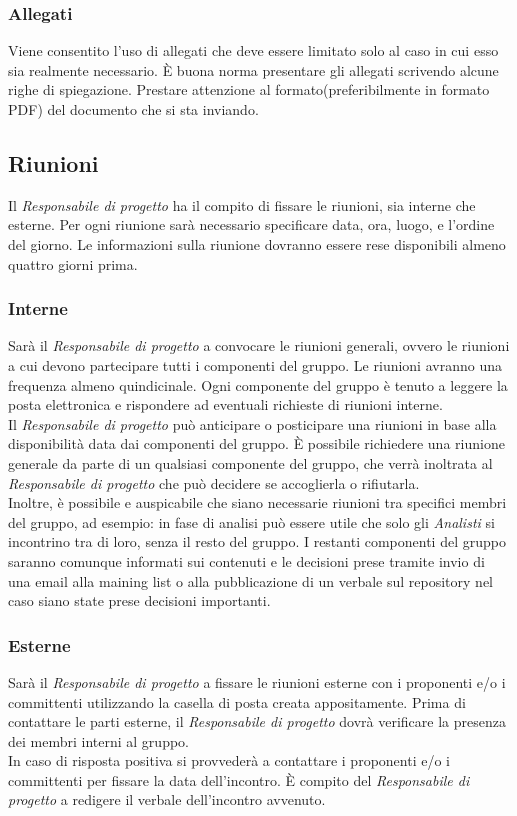 		\subsubsection{Allegati}
Viene consentito l'uso di allegati che deve essere limitato solo al caso in cui esso sia realmente necessario. È buona norma presentare gli allegati scrivendo alcune righe di spiegazione. Prestare attenzione al formato(preferibilmente in formato \gls{PDF}) del documento che si sta inviando. 

	\subsection{Riunioni}
Il \textit{Responsabile di progetto} ha il compito di fissare le riunioni, sia interne che esterne. Per ogni riunione sarà necessario specificare data, ora, luogo, e l'ordine del giorno. Le informazioni sulla riunione dovranno essere rese disponibili almeno quattro giorni prima.
		\subsubsection{Interne}
Sarà il \textit{Responsabile di progetto} a convocare le riunioni generali, ovvero le riunioni a cui devono partecipare tutti i componenti del gruppo. Le riunioni avranno una frequenza almeno quindicinale. Ogni componente del gruppo è tenuto a leggere la posta elettronica e rispondere ad eventuali richieste di riunioni interne. \\
Il \textit{Responsabile di progetto} può anticipare o posticipare una riunioni in base alla disponibilità data dai componenti del gruppo. È possibile richiedere una riunione generale da parte di un qualsiasi componente del gruppo, che verrà inoltrata al \textit{Responsabile di progetto} che può decidere se accoglierla o rifiutarla.\\
Inoltre, è possibile e auspicabile che siano necessarie riunioni tra specifici membri del gruppo, ad esempio: in fase di analisi può essere utile che solo gli \textit{Analisti} si incontrino tra di loro, senza il resto del gruppo. I restanti componenti del gruppo saranno comunque informati sui contenuti e le decisioni prese tramite invio di una email alla \gls{maining list} o alla pubblicazione di un \gls{verbale} sul \gls{repository} nel caso siano state prese decisioni importanti.
		\subsubsection{Esterne}
Sarà il \textit{Responsabile di progetto} a fissare le riunioni esterne con i proponenti e/o i committenti utilizzando la casella di posta creata appositamente. Prima di contattare le parti esterne, il \textit{Responsabile di progetto} dovrà verificare la presenza dei membri interni al gruppo. \\
In caso di risposta positiva si provvederà a contattare i proponenti e/o i committenti per fissare la data dell'incontro.
È compito del \textit{Responsabile di progetto} a redigere il \gls{verbale} dell'incontro avvenuto.

